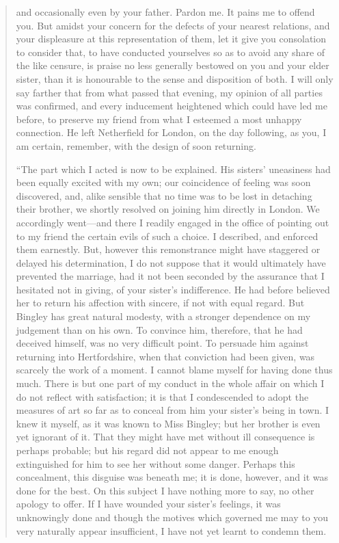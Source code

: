 \documentclass[12pt,english]{book}
\begin{document}
\begin{quotation}
and occasionally even by your father. Pardon me. It pains me to offend
you. But amidst your concern for the defects of your nearest relations,
and your displeasure at this representation of them, let it give you
consolation to consider that, to have conducted yourselves so as to
avoid any share of the like censure, is praise no less generally bestowed
on you and your elder sister, than it is honourable to the sense and
disposition of both. I will only say farther that from what passed
that evening, my opinion of all parties was confirmed, and every inducement
heightened which could have led me before, to preserve my friend from
what I esteemed a most unhappy connection. He left Netherfield for
London, on the day following, as you, I am certain, remember, with
the design of soon returning.

{}``The part which I acted is now to be explained. His sisters' uneasiness
had been equally excited with my own; our coincidence of feeling was
soon discovered, and, alike sensible that no time was to be lost in
detaching their brother, we shortly resolved on joining him directly
in London. We accordingly went\mbox{---}and there I readily engaged
in the office of pointing out to my friend the certain evils of such
a choice. I described, and enforced them earnestly. But, however this
remonstrance might have staggered or delayed his determination, I
do not suppose that it would ultimately have prevented the marriage,
had it not been seconded by the assurance that I hesitated not in
giving, of your sister's indifference. He had before believed her
to return his affection with sincere, if not with equal regard. But
Bingley has great natural modesty, with a stronger dependence on my
judgement than on his own. To convince him, therefore, that he had
deceived himself, was no very difficult point. To persuade him against
returning into Hertfordshire, when that conviction had been given,
was scarcely the work of a moment. I cannot blame myself for having
done thus much. There is but one part of my conduct in the whole affair
on which I do not reflect with satisfaction; it is that I condescended
to adopt the measures of art so far as to conceal from him your sister's
being in town. I knew it myself, as it was known to Miss Bingley;
but her brother is even yet ignorant of it. That they might have met
without ill consequence is perhaps probable; but his regard did not
appear to me enough extinguished for him to see her without some danger.
Perhaps this concealment, this disguise was beneath me; it is done,
however, and it was done for the best. On this subject I have nothing
more to say, no other apology to offer. If I have wounded your sister's
feelings, it was unknowingly done and though the motives which governed
me may to you very naturally appear insufficient, I have not yet learnt
to condemn them.


\end{quotation}
\end{document}
